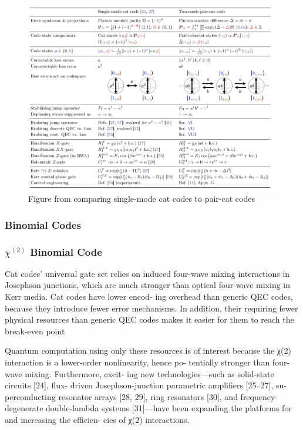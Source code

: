 \documentclass[12]{amsart}
\newcommand\0{\mathbf{0}}
\newcommand\<{\langle}
\renewcommand\>{\rangle}
\begin{document}
\begin{figure}[H]
\centering
\includegraphics[width=\linewidth,keepaspectratio]{pair_cat.png}	
\caption{Figure from \cite{albert2018multimode} comparing single-mode cat codes to pair-cat codes}
\end{figure}


\subsubsection{Binomial Codes}
\label{sec:multi-binom}
\subsubsection*{$\chi^{(2)}$ Binomial Code}

Cat codes’ universal gate set relies on induced four-wave mixing interactions in Josephson junctions, which are much stronger than optical four-wave mixing in Kerr media. Cat codes have lower encod- ing overhead than generic QEC codes, because they introduce fewer error mechanisms. In addition, their requiring fewer physical resources than generic QEC codes makes it easier for them to reach the break-even point 

Quantum computation using only these resources is of interest because the χ(2) interaction is a lower-order nonlinearity, hence po- tentially stronger than four-wave mixing. Furthermore, excit- ing new technologies—such as solid-state circuits [24], flux- driven Josephson-junction parametric amplifiers [25–27], su- perconducting resonator arrays [28, 29], ring resonators [30], and frequency-degenerate double-lambda systems [31]—have been expanding the platforms for and increasing the efficien- cies of χ(2) interactions.
\end{document}

